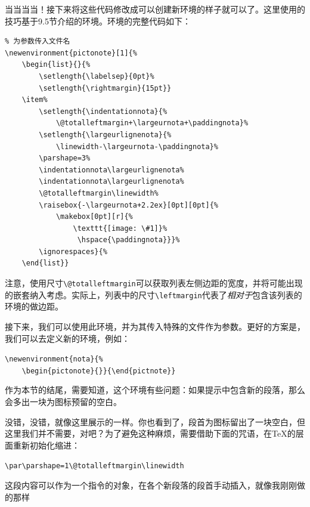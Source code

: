 当当当当！接下来将这些代码修改成可以创建新环境的样子就可以了。这里使用的技巧基于9.5节介绍的环境。环境的完整代码如下：

\begin{dmd}
\begin{verbatim}
% 为参数传入文件名
\newenvironment{pictonote}[1]{% 
    \begin{list}{}{%
        \setlength{\labelsep}{0pt}%
        \setlength{\rightmargin}{15pt}} 
    \item%
        \setlength{\indentationnota}{% 
            \@totalleftmargin+\largeurnota+\paddingnota}%
        \setlength{\largeurlignenota}{% 
            \linewidth-\largeurnota-\paddingnota}%
        \parshape=3% 
        \indentationnota\largeurlignenota% 
        \indentationnota\largeurlignenota% 
        \@totalleftmargin\linewidth% 
        \raisebox{-\largeurnota+2.2ex}[0pt][0pt]{%
            \makebox[0pt][r]{% 
                \texttt{[image: \#1]}%
                 \hspace{\paddingnota}}}%
        \ignorespaces}{% 
    \end{list}}\end{verbatim}
\end{dmd}

\begin{exclamation}
注意，使用尺寸\verb|\@totalleftmargin|可以获取列表左侧边距的宽度，并将可能出现的嵌套纳入考虑。实际上，列表中的尺寸\verb|\leftmargin|代表了\emph{相对于}包含该列表的环境的做边距。
\end{exclamation}

接下来，我们可以使用此环境，并为其传入特殊的文件作为参数。更好的方案是，我们可以去定义新的环境，例如：

\begin{dmd}
\verb+\newenvironment{nota}{%+\\
\verb+    \begin{pictonote}{+\verb+}}{\end{pictnote}}+
\end{dmd}

\begin{qquestion}
作为本节的结尾，需要知道，这个环境有些问题：如果提示中包含新的段落，那么会多出一块为图标预留的空白。%

没错，没错，就像这里展示的一样。你也看到了，段首为图标留出了一块空白，但这里我们并不需要，对吧？为了避免这种麻烦，需要借助下面的咒语，在\TeX 的层面重新初始化缩进：

\begin{dmd}
\verb|\par\parshape=1\@totalleftmargin\linewidth|
\end{dmd}

这段内容可以作为一个指令的对象，在各个新段落的段首手动插入，就像我刚刚做的那样\dm{:-)}
\end{qquestion}

